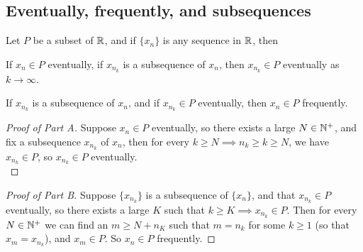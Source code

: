 \documentclass[../../main.tex]{subfiles}
\begin{document}
\subsection{Eventually, frequently, and subsequences}
\begin{wts}\label{lemma:eventually frequently and subsequences}
    Let $P$ be a subset of $\mathbb{R}$, and if $\{x_n\}$ is any sequence in $\mathbb{R}$, then
    \begin{enumalpha}
        \item If $x_n\in P$ eventually, if $x_{n_k}$ is a subsequence of $x_n$, then $x_{n_k}\in P$ eventually as $k\to\infty$.
        \item If $x_{n_k}$ is a subsequence of $x_n$, and if $x_{n_k}\in P$ eventually, then $x_n\in P$ frequently.
    \end{enumalpha}
\end{wts}
\begin{proof}[Proof of Part A]
    Suppose $x_n\in P$ eventually, so there exists a large $N\in\mathbb{N}^+$, and fix a subsequence $x_{n_k}$ of $x_n$, then for every $k\geq N\implies n_k\geq k\geq N$, we have $x_{n_k}\in P$, so $x_{n_k}\in P$ eventually.\\
\end{proof}
\begin{proof}[Proof of Part B]
    Suppose $\{x_{n_k}\}$ is a subsequence of $\{x_n\}$, and that $x_{n_k}\in P$ eventually, so there exists a large $K$ such that $k\geq K\implies x_{n_k}\in P$. Then for every $N\in\mathbb{N}^+$ we can find an $m\geq N + n_K$ such that $m=n_k$ for some $k\geq 1$ (so that $x_m = x_{n_k}$), and $x_m\in P$. So $x_n\in P$ frequently.
\end{proof}
\end{document}
